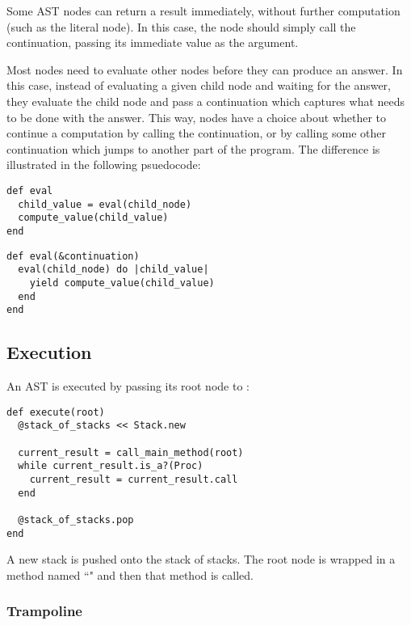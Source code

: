 Some AST nodes can return a result immediately, without further computation (such as the literal  node). In this case, the node should simply call the continuation, passing its immediate value as the argument.

Most nodes need to evaluate other nodes before they can produce an answer. In this case, instead of evaluating a given child node and waiting for the answer, they evaluate the child node and pass a continuation which captures what needs to be done with the answer. This way, nodes have a choice about whether to continue a computation by calling the continuation, or by calling some other continuation which jumps to another part of the program. The difference is illustrated in the following psuedocode:

\begin{lstlisting}[title={\textbf{Without CPS}}]
def eval
  child_value = eval(child_node)
  compute_value(child_value)
end
\end{lstlisting}

\begin{lstlisting}[title={\textbf{With CPS}}]
def eval(&continuation)
  eval(child_node) do |child_value|
    yield compute_value(child_value)
  end
end
\end{lstlisting}

\subsection{Execution}

An AST is executed by passing its root node to :

\begin{minipage}{\textwidth}
\begin{lstlisting}
def execute(root)
  @stack_of_stacks << Stack.new
  
  current_result = call_main_method(root)
  while current_result.is_a?(Proc)
    current_result = current_result.call
  end
  
  @stack_of_stacks.pop
end
\end{lstlisting}
\end{minipage}

A new stack is pushed onto the stack of stacks. The root node is wrapped in a method named ``" and then that method is called.

\subsubsection{Trampoline}

